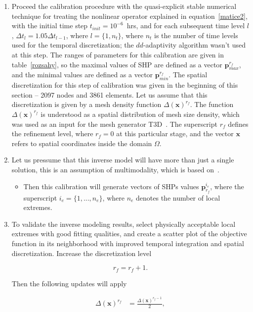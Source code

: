 \documentclass[review]{myarticle}
\newenvironment{lineq}
    {\begin{linenomath*}
    \begin{equation}
    }
    { 
    \end{equation} 
    \end{linenomath*}
    }
\renewcommand{\vec}{\mathbf}
\begin{document}
\begin{enumerate}[label=({\bf \roman*})]
\item Proceed the calibration procedure with the quasi-explicit stable numerical technique for treating the nonlinear operator explained in equation~\eqref{matice2}, with the initial time step $t_{init}= 10^{-6}$~hrs, and for each subsequent time level $l$, $\Delta t_l = 1.05 \Delta t_{l-1}$, where $l=\{1,n_t\}$, where $n_t$ is the number of time levels used for the temporal discretization; the $dd$-adaptivity algorithm wasn't used at this step. The ranges of parameters for this calibration are given in table~\ref{rozsahy}, so the maximal values of SHP are defined as a vector $\vec{p}^{r_f}_{max}$, and the minimal values are defined as a vector $\vec{p}^{r_f}_{min}$. The spatial discretization for this step of calibration was given in the beginning of this section -- 2097 nodes and 3861 elements. 
Let us assume that this discretization is given by a mesh density function ${\Delta}(\vec{x})^{r_f}$. The function $\Delta(\vec{x})^{r_f}$ is understood as a spatial distribution of mesh size density, which was used as an input for the mesh generator T3D~\citep{t3d}. The superscript $r_f$ defines the refinement level, where $r_f=0$ at this particular stage, and the vector $\vec{x}$ refers to spatial coordinates inside the domain $\Omega$.
\item Let us pressume that this inverse model will have more than just a single solution, this is an assumption of multimodality, which is based on~\citep{beven2003-uncertain}. \begin{itemize} \item Then this calibration will generate vectors of SHPs values $\vec{p}^{i_e}_{r_f}$, where the superscript $i_e=\{1,...,n_e\}$, where $n_e$     denotes the number of  local extremes. \end{itemize} 
\item To validate the inverse modeling results, select physically acceptable local extremes with good fitting qualities, and create a scatter plot of the objective function in its neighborhood  with improved temporal integration and spatial discretization. Increase the discretization level \begin{lineq} r_f=r_f+1.\end{lineq} Then the following updates will apply
\begin{lineq}
\label{coeffs}
\begin{split}
\Delta(\vec{x})^{r_f}  &= \frac{\Delta(\vec{x})^{r_f-1}}{2}, \\

\end{split}
\end{lineq}
\end{enumerate}
\end{document}
